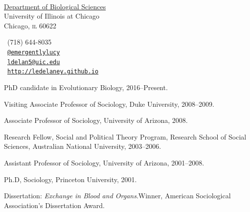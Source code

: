\documentclass[11pt,article,oneside]{memoir}
\makeatletter
\def\myemail{ldelan5@uic.edu}
\def\myweb{http://ledelaney.github.io}
\def\myphone{(718) 644-8035}
\def\mytwitter{@emergentlylucy}
\makeatother
\begin{document}
\noindent

\begin{minipage}{.65\textwidth}
\vspace{1mm}
  {\footnotesize {}\\ \href{http://bios.uic.edu}{Department of Biological Sciences} \\ University of Illinois at Chicago \\ \vspace{-0.05in} Chicago, \textsc{il} 60622}
\end{minipage}
\hfill
\begin{minipage}{.65\textwidth}
{\footnotesize \faPhone \ \myphone} \\
{\scriptsize \faTwitter \  \texttt{\href{http://twitter.com/emergentylucy}{\mytwitter}}}\\
{\scriptsize \faEnvelope \  \texttt{\href{mailto:\myemail}{\myemail}}}\\
{\scriptsize \faGithub \ \texttt{\href{\myweb}{\myweb}}}


\end{minipage}

\bigskip       
\reversemarginpar

\bigskip

\marginhead{\sffamily \textbf{\textcolor{maroon}{education}}}

\ind PhD candidate in Evolutionary Biology, 2016--Present.

\ind Visiting Associate Professor of Sociology, Duke University,
2008--2009.

\ind Associate Professor of Sociology, University of Arizona, 2008.

\ind Research Fellow, Social and Political Theory Program, Research
School of Social Sciences, Australian National University, 2003--2006.

\ind Assistant Professor of Sociology, University of Arizona,
2001--2008.

\bigskip


\ind Ph.D, Sociology, Princeton University, 2001.

\ind \hspace{0.35in} \footnotesize Dissertation:
\emph{Exchange in Blood and Organs}.\newline Winner, American
Sociological Association's Dissertation
Award.\normalsize \vspace{0.05in}
\end{document}
